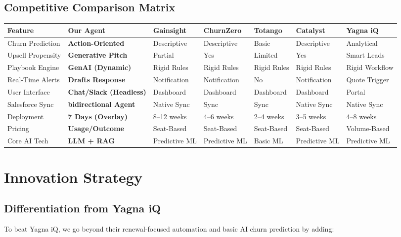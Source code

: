 \documentclass[12pt,a4paper]{article}
\begin{document}
\subsection{Competitive Comparison Matrix}
\footnotesize
\setlength{\tabcolsep}{2pt}
\renewcommand{\arraystretch}{1.2}

\begin{longtable}{|p{2.2cm}|p{2.8cm}|p{1.7cm}|p{1.7cm}|p{1.5cm}|p{1.7cm}|p{2.2cm}|}
\hline
\textbf{Feature} & \textbf{Our Agent} & \textbf{Gainsight} & \textbf{ChurnZero} & \textbf{Totango} & \textbf{Catalyst} & \textbf{Yagna iQ} \\
\hline
Churn Prediction & \textbf{Action-Oriented} & Descriptive & Descriptive & Basic & Descriptive & Analytical \\
\hline
Upsell Propensity & \textbf{Generative Pitch} & Partial & Yes & Limited & Yes & Smart Leads \\
\hline
Playbook Engine & \textbf{GenAI (Dynamic)} & Rigid Rules & Rigid Rules & Rigid Rules & Rigid Rules & Rigid Workflow \\
\hline
Real-Time Alerts & \textbf{Drafts Response} & Notification & Notification & No & Notification & Quote Trigger \\
\hline
User Interface & \textbf{Chat/Slack (Headless)} & Dashboard & Dashboard & Dashboard & Dashboard & Portal \\
\hline
Salesforce Sync & \textbf{ bidirectional Agent} & Native Sync & Sync & Sync & Native Sync & Native Sync \\
\hline
Deployment & \textbf{7 Days (Overlay)} & 8--12 weeks & 4--6 weeks & 2--4 weeks & 3--5 weeks & 4--8 weeks \\
\hline
Pricing & \textbf{Usage/Outcome} & Seat-Based & Seat-Based & Seat-Based & Seat-Based & Volume-Based \\
\hline
Core AI Tech & \textbf{LLM + RAG} & Predictive ML & Predictive ML & Basic ML & Predictive ML & Predictive ML \\
\hline
\end{longtable}
\normalsize


\section{Innovation Strategy}

\subsection{Differentiation from Yagna iQ}
To beat Yagna iQ, we go beyond their renewal-focused automation and basic AI churn prediction by adding:
\end{document}

